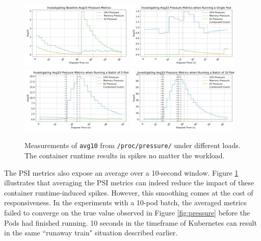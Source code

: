 \begin{figure}[ht]
    \centering
    \includegraphics[width=0.48\textwidth]{images/avg-pressure-baseline.png}
    \includegraphics[width=0.48\textwidth]{images/avg-pressure-single.png} \\
    \includegraphics[width=0.48\textwidth]{images/avg-pressure-smallbatch.png}
    \includegraphics[width=0.48\textwidth]{images/avg-pressure-bigbatch.png}
    \caption{Measurements of \texttt{avg10} from \texttt{/proc/pressure/} under
    different loads. The container runtime results in spikes no matter the
    workload.} \label{fig:pressure-avg}
\end{figure}
The PSI metrics also expose an average over a 10-second window. Figure
\ref{fig:pressure-avg} illustrates that averaging the PSI metrics can indeed
reduce the impact of these container runtime-induced spikes. However, this
smoothing comes at the cost of responsiveness. In the experiments with a 10-pod
batch, the averaged metrics failed to converge on the true value observed in
Figure \ref{fig:pressure} before the Pods had finished running. 10 seconds in
the timeframe of Kubernetes can result in the same ``runaway train" situation
described earlier.

